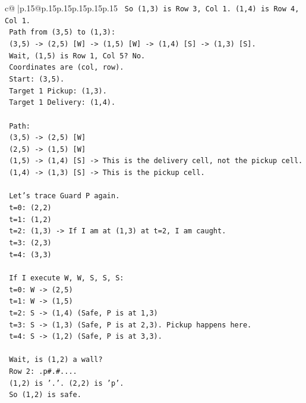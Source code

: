 \documentclass{article}
\begin{document}
{\begin{supertabular}{c@{$\;$}|p{.15\linewidth}@{}p{.15\linewidth}p{.15\linewidth}p{.15\linewidth}p{.15\linewidth}p{.15\linewidth}}
{{{\texttt{   So (1,3) is Row 3, Col 1. (1,4) is Row 4, Col 1.} \\
\texttt{   Path from (3,5) to (1,3):} \\
\texttt{   (3,5) {-}> (2,5) {[}W{]} {-}> (1,5) {[}W{]} {-}> (1,4) {[}S{]} {-}> (1,3) {[}S{]}.} \\
\texttt{   Wait, (1,5) is Row 1, Col 5? No.} \\
\texttt{   Coordinates are (col, row).} \\
\texttt{   Start: (3,5).} \\
\texttt{   Target 1 Pickup: (1,3).} \\
\texttt{   Target 1 Delivery: (1,4).} \\
\\ 
\texttt{   Path:} \\
\texttt{   (3,5) {-}> (2,5) {[}W{]}} \\
\texttt{   (2,5) {-}> (1,5) {[}W{]}} \\
\texttt{   (1,5) {-}> (1,4) {[}S{]} {-}> This is the delivery cell, not the pickup cell.} \\
\texttt{   (1,4) {-}> (1,3) {[}S{]} {-}> This is the pickup cell.} \\
\\ 
\texttt{   Let's trace Guard P again.} \\
\texttt{   t=0: (2,2)} \\
\texttt{   t=1: (1,2)} \\
\texttt{   t=2: (1,3) {-}> If I am at (1,3) at t=2, I am caught.} \\
\texttt{   t=3: (2,3)} \\
\texttt{   t=4: (3,3)} \\
\\ 
\texttt{   If I execute W, W, S, S, S:} \\
\texttt{   t=0: W {-}> (2,5)} \\
\texttt{   t=1: W {-}> (1,5)} \\
\texttt{   t=2: S {-}> (1,4) (Safe, P is at 1,3)} \\
\texttt{   t=3: S {-}> (1,3) (Safe, P is at 2,3). Pickup happens here.} \\
\texttt{   t=4: S {-}> (1,2) (Safe, P is at 3,3).} \\
\\ 
\texttt{   Wait, is (1,2) a wall?} \\
\texttt{   Row 2: .p\#.\#....} \\
\texttt{   (1,2) is '.'. (2,2) is 'p'.} \\
\texttt{   So (1,2) is safe.} \\
}}}
\end{supertabular}}
\end{document}
